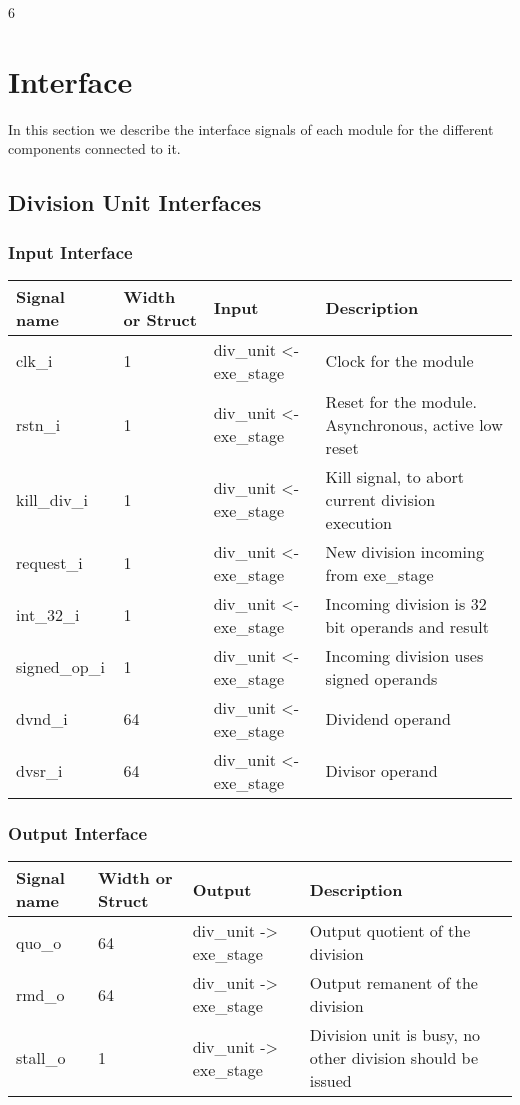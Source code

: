 6\section{Interface}
\label{chapter 4}

In this section we describe the interface signals of each module for the different components connected to it.

\subsection{Division Unit Interfaces}

\subsubsection{Input Interface}

\begin{table}[H]
\centering
\begin{tabular}{l|p{3cm}|l|p{4cm}}
\hline
\hline
Signal name & Width or Struct & Input & Description \\
\hline
\hline
clk\_i & 1 & div\_unit <- exe\_stage & Clock for the module \\
\hline
rstn\_i & 1 & div\_unit <- exe\_stage & Reset for the module. Asynchronous, active low reset \\
\hline
kill\_div\_i & 1 & div\_unit <- exe\_stage & Kill signal, to abort current division execution \\
\hline
request\_i & 1 & div\_unit <- exe\_stage & New division incoming from exe\_stage \\
\hline
int\_32\_i & 1 & div\_unit <- exe\_stage & Incoming division is 32 bit operands and result \\
\hline
signed\_op\_i & 1 & div\_unit <- exe\_stage & Incoming division uses signed operands \\
\hline
dvnd\_i & 64 & div\_unit <- exe\_stage & Dividend operand \\
\hline
dvsr\_i & 64 & div\_unit <- exe\_stage & Divisor operand \\
\hline
\hline
\end{tabular}
\end{table}


\subsubsection{Output Interface}

\begin{table}[H]
\centering
\begin{tabular}{l|p{3cm}|l|p{4cm}}
\hline
\hline
Signal name & Width or Struct & Output & Description \\
\hline
\hline
quo\_o & 64 & div\_unit -> exe\_stage & Output quotient of the division \\
\hline
rmd\_o & 64 & div\_unit -> exe\_stage & Output remanent of the division \\
\hline
stall\_o & 1 & div\_unit -> exe\_stage & Division unit is busy, no other division should be issued \\
\hline
\hline
\end{tabular}
\end{table}

